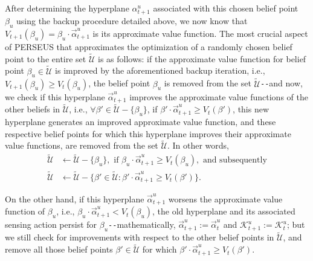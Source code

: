 \documentclass[12pt, draftcls, onecolumn]{IEEEtran}
\begin{document}
After determining the hyperplane $\alpha_{t+1}^{u}$ associated with this chosen belief point $\beta_{u}$ using the backup procedure detailed above, we now know that $V_{t+1}(\beta_{u}){=}\beta_{u}{\cdot}\vec{\alpha}_{t+1}^{u}$ is its approximate value function. The most crucial aspect of PERSEUS that approximates the optimization of a randomly chosen belief point to the entire set $\tilde{\mathcal{U}}$ is as follows: if the approximate value function for belief point $\beta_{u}{\in}\tilde{\mathcal{U}}$ is improved by the aforementioned backup iteration, i.e., $V_{t+1}(\beta_{u}){\geq}V_{t}(\beta_{u})$, the belief point $\beta_{u}$ is removed from the set $\tilde{\mathcal{U}}$\texttt{-{}-}and now, we check if this hyperplane $\vec{\alpha}_{t+1}^{u}$ improves the approximate value functions of the other beliefs in $\tilde{\mathcal{U}}$, i.e., ${\forall}\beta'{\in}\tilde{\mathcal{U}}{-}\{\beta_{u}\}$, if $\beta'{\cdot}\vec{\alpha}_{t+1}^{u}{\geq}V_{t}(\beta')$, this new hyperplane generates an improved approximate value function, and these respective belief points for which this hyperplane improves their approximate value functions, are removed from the set $\tilde{\mathcal{U}}$. In other words,
\begin{equation}\label{28}
    \begin{aligned}
        \tilde{\mathcal{U}} &\longleftarrow \tilde{\mathcal{U}}-\{\beta_{u}\},\text{ if }\beta_{u}{\cdot}\vec{\alpha}_{t+1}^{u} \geq V_{t}(\beta_{u}),\text{ and subsequently}\\
        \tilde{\mathcal{U}} &\longleftarrow \tilde{\mathcal{U}}-\{\beta' \in \tilde{\mathcal{U}}:\beta' \cdot \vec{\alpha}_{t+1}^{u} \geq V_{t}(\beta')\}.
    \end{aligned}
\end{equation}

On the other hand, if this hyperplane $\vec{\alpha}_{t+1}^{u}$ worsens the approximate value function of $\beta_{u}$, i.e., $\beta_{u}{\cdot}\vec{\alpha}_{t+1}^{u}{<}V_{t}(\beta_{u})$, the old hyperplane and its associated sensing action persist for $\beta_{u}$\texttt{-{}-}mathematically, $\vec{\alpha}_{t+1}^{u}{:=}\vec{\alpha}_{t}^{u}$ and $\mathcal{K}_{t+1}^{u}{:=}\mathcal{K}_{t}^{u}$; but we still check for improvements with respect to the other belief points in $\tilde{\mathcal{U}}$, and remove all those belief points $\beta'{\in}\tilde{\mathcal{U}}$ for which $\beta'{\cdot}\vec{\alpha}_{t+1}^{u}{\geq}V_{t}(\beta')$. 
\end{document}
